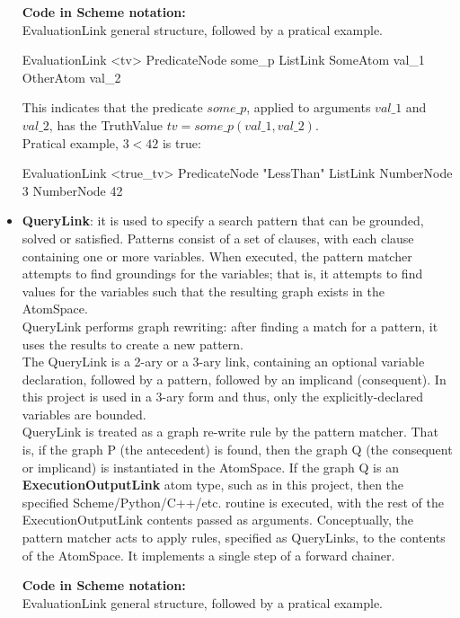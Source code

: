 \begin{itemize}
\begin{footnotesize}\textbf{Code in Scheme notation:} \\
EvaluationLink general structure, followed by a pratical example.
\end{footnotesize}
\begin{python}
	EvaluationLink <tv>
   		PredicateNode some_p
   		ListLink
       			SomeAtom val_1
       			OtherAtom val_2
\end{python}
This indicates that the predicate $some\_p$, applied to arguments $val\_1$ and $val\_2$, has the TruthValue $tv = some\_p(val\_1, val\_2)$. \\
Pratical example, $3 < 42$ is true:
\begin{python}
	 EvaluationLink <true_tv>
		PredicateNode "LessThan"
		ListLink
			NumberNode 3
			NumberNode 42
\end{python}

	\item \textbf{QueryLink}: it is used to specify a search pattern that can be grounded, solved or satisfied. Patterns consist of a set of clauses, with each clause containing one or more variables. When executed, the pattern matcher attempts to find groundings for the variables; that is, it attempts to find values for the variables such that the resulting graph exists in the AtomSpace. \\
QueryLink performs graph rewriting: after finding a match for a pattern, it uses the results to create a new pattern. \\
The QueryLink is a 2-ary or a 3-ary link, containing an optional variable declaration, followed by a pattern, followed by an implicand (consequent). In this project is used in a 3-ary form and thus, only the explicitly-declared variables are bounded. \\
QueryLink is treated as a graph re-write rule by the pattern matcher. That is, if the graph P (the antecedent) is found, then the graph Q (the consequent or implicand) is instantiated in the AtomSpace. If the graph Q is an \textbf{ExecutionOutputLink} atom type, such as in this project, then the specified Scheme/Python/C++/etc. routine is executed, with the rest of the ExecutionOutputLink contents passed as arguments. Conceptually, the pattern matcher acts to apply rules, specified as QueryLinks, to the contents of the AtomSpace. It implements a single step of a forward chainer.

\begin{footnotesize}\textbf{Code in Scheme notation:} \\
EvaluationLink general structure, followed by a pratical example.
\end{footnotesize}


\end{itemize}
